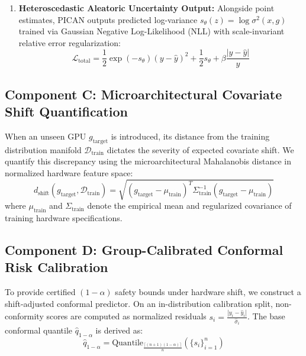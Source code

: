 \documentclass[3p,12pt]{elsarticle}
\begin{document}
\begin{enumerate}
    Similarly, for operational power draw, predictions are bounded within the physical TDP envelope:
    \begin{equation}
    \hat{P}(x, g) = TDP(g) \cdot \sigma\left(p_\theta(z)\right)
    \end{equation}
    where $\sigma(\cdot)$ is the Sigmoid activation function, guaranteeing $\hat{P} \in (0, TDP(g))$.
    \item \textbf{Heteroscedastic Aleatoric Uncertainty Output:} Alongside point estimates, PICAN outputs predicted log-variance $s_\theta(z) = \log \sigma^2(x, g)$ trained via Gaussian Negative Log-Likelihood (NLL) with scale-invariant relative error regularization:
    \begin{equation}
    \mathcal{L}_{\text{total}} = \frac{1}{2} \exp(-s_\theta) (y - \hat{y})^2 + \frac{1}{2} s_\theta + \beta \frac{|y - \hat{y}|}{y}
    \end{equation}
\end{enumerate}

\subsection{Component C: Microarchitectural Covariate Shift Quantification}
When an unseen GPU $g_{\text{target}}$ is introduced, its distance from the training distribution manifold $\mathcal{D}_{\text{train}}$ dictates the severity of expected covariate shift. We quantify this discrepancy using the microarchitectural Mahalanobis distance in normalized hardware feature space:
\begin{equation}
\label{eq:mahalanobis}
d_{\text{shift}}(g_{\text{target}}, \mathcal{D}_{\text{train}}) = \sqrt{(g_{\text{target}} - \mu_{\text{train}})^T \Sigma_{\text{train}}^{-1} (g_{\text{target}} - \mu_{\text{train}})}
\end{equation}
where $\mu_{\text{train}}$ and $\Sigma_{\text{train}}$ denote the empirical mean and regularized covariance of training hardware specifications.

\subsection{Component D: Group-Calibrated Conformal Risk Calibration}
To provide certified $(1-\alpha)$ safety bounds under hardware shift, we construct a shift-adjusted conformal predictor. On an in-distribution calibration split, non-conformity scores are computed as normalized residuals $s_i = \frac{|y_i - \hat{y}_i|}{\hat{\sigma}_i}$. The base conformal quantile $\hat{q}_{1-\alpha}$ is derived as:
\begin{equation}
\hat{q}_{1-\alpha} = \text{Quantile}_{\frac{\lceil (n+1)(1-\alpha) \rceil}{n}}\left(\{s_i\}_{i=1}^n\right)
\end{equation}
\end{document}
